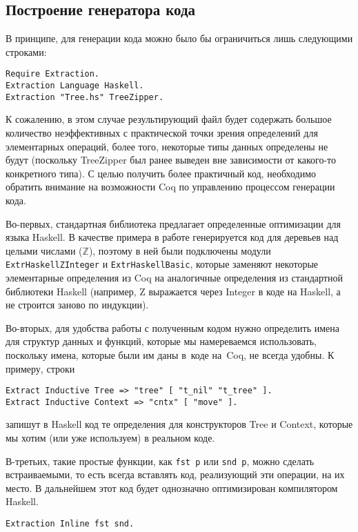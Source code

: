  
\subsection{Построение генератора кода}
В принципе, для генерации кода можно было бы ограничиться лишь следующими строками:
\begin{Verbatim}[fontsize=\small]
Require Extraction.
Extraction Language Haskell.
Extraction "Tree.hs" TreeZipper.
\end{Verbatim}
К сожалению, в этом случае результирующий файл будет содержать большое количество неэффективных с практической точки зрения определений для элементарных операций, более того, некоторые типы данных определены не будут (поскольку TreeZipper был ранее выведен вне зависимости от какого-то конкретного типа). С целью получить более практичный код, необходимо обратить внимание на возможности Coq по управлению процессом генерации кода.

Во-первых, стандартная библиотека предлагает определенные оптимизации для языка Haskell. В качестве примера в работе генерируется код для деревьев над целыми числами ($\mathbb{Z}$), поэтому в ней были подключены модули \texttt{ExtrHaskellZInteger} и \texttt{ExtrHaskellBasic}, которые заменяют некоторые элементарные определения из Coq на аналогичные определения из стандартной библиотеки Haskell (например, Z выражается через Integer в коде на Haskell, а не строится заново по индукции).

Во-вторых, для удобства работы с полученным кодом нужно определить имена для структур данных и функций, которые мы намереваемся использовать, поскольку имена, которые были им даны в~коде на~Coq, не всегда удобны. К примеру, строки
\begin{Verbatim}[fontsize=\small]
Extract Inductive Tree => "tree" [ "t_nil" "t_tree" ].
Extract Inductive Context => "cntx" [ "move" ].
\end{Verbatim}
запишут в Haskell код те определения для конструкторов Tree и Context, которые мы хотим (или уже используем) в реальном коде. 

В-третьих, такие простые функции, как \texttt{fst p} или \texttt{snd p}, можно сделать встраиваемыми, то есть всегда вставлять код, реализующий эти операции, на их место. В дальнейшем этот код будет однозначно оптимизирован компилятором Haskell.
\begin{Verbatim}[fontsize=\small]
Extraction Inline fst snd.
\end{Verbatim}

\newpage

